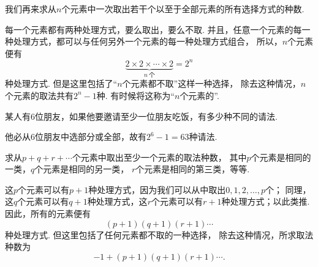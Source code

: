 我们再来求从\(n\)个元素中一次取出若干个以至于全部元素的所有选择方式的种数.

每一个元素都有两种处理方式，要么取出，要么不取.
并且，任意一个元素的每一种处理方式，都可以与任何另外一个元素的每一种处理方式组合，
所以，\(n\)个元素便有\[
	\underbrace{2 \times 2 \times \dotsm \times 2}_{n\ \text{个}}
	= 2^n
\]种处理方式.
但是这里包括了“\(n\)个元素都不取”这样一种选择，
除去这种情况，\(n\)个元素的取法共有\(2^n-1\)种.
有时候将这称为“\(n\)个元素的”.

\begin{example}
某人有6位朋友，如果他要邀请至少一位朋友吃饭，有多少种不同的请法.
\begin{solution}
他必从6位朋友中选部分或全部，故有\(2^6-1=63\)种请法.
\end{solution}
\end{example}

\begin{example}
求从\(p+q+r+\dotsb\)个元素中取出至少一个元素的取法种数，
其中\(p\)个元素是相同的一类，\(q\)个元素是相同的另一类，
\(r\)个元素是相同的第三类，等等.
\begin{solution}
这\(p\)个元素可以有\(p+1\)种处理方式，因为我们可以从中取出\(0,1,2,\dotsc,p\)个；
同理，这\(q\)个元素可以有\(q+1\)种处理方式，这\(r\)个元素可以有\(r+1\)种处理方式；以此类推.
因此，所有的元素便有\[
	(p+1)(q+1)(r+1)\dotsm
\]种处理方式.
但这里包括了任何元素都不取的一种选择，
除去这种情况，所求取法种数为\[
	-1+(p+1)(q+1)(r+1)\dotsm.
\]
\end{solution}
\end{example}



